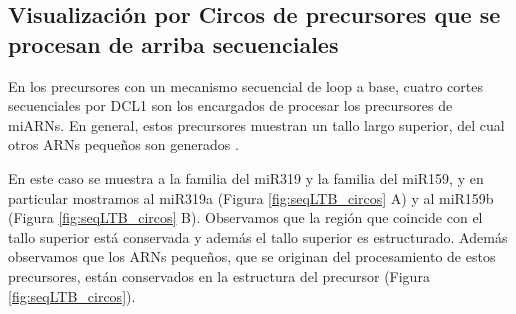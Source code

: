 \subsection{Visualización por Circos de precursores que se procesan de arriba secuenciales}

En los precursores con un mecanismo secuencial de loop a base, cuatro cortes secuenciales por DCL1 son los encargados de procesar los precursores de miARNs.
En general, estos precursores muestran un tallo largo superior, del cual otros ARNs pequeños son generados \citep{pmid19850910,Bologna2009,Bologna2013}.

En este caso se muestra a la familia del miR319 y la familia del miR159, y en particular mostramos al miR319a (Figura \ref{fig:seqLTB_circos} A) y al miR159b (Figura \ref{fig:seqLTB_circos} B).
Observamos que la región que coincide con el tallo superior está conservada y además el tallo superior es estructurado.
Además observamos que los ARNs pequeños, que se originan del procesamiento de estos precursores, están conservados en la estructura del precursor (Figura \ref{fig:seqLTB_circos}).




